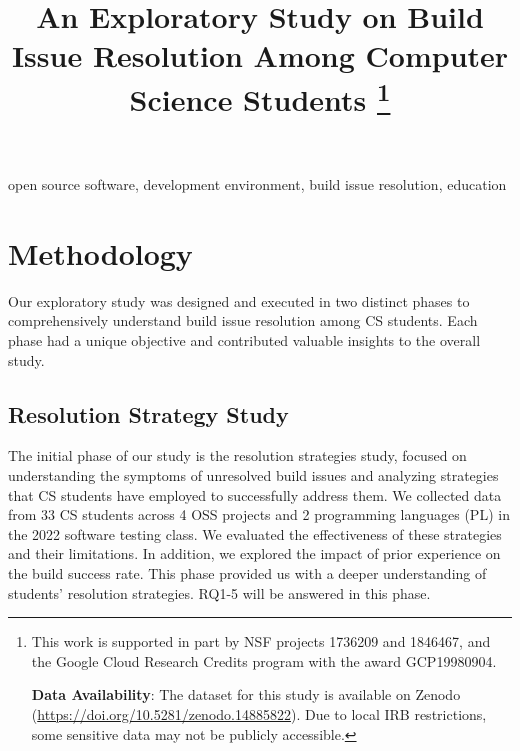\documentclass[10pt, conference]{IEEEtran}
\begin{document}
\title{An Exploratory Study on Build Issue Resolution Among Computer Science Students
\thanks{This work is supported in part by NSF projects 1736209 and 1846467, and the Google Cloud Research Credits program with the award GCP19980904. 

\textbf{Data Availability}: The dataset for this study is available on Zenodo (\href{https://doi.org/10.5281/zenodo.14885822}{https://doi.org/10.5281/zenodo.14885822}). Due to local IRB restrictions, some sensitive data may not be publicly accessible.}
}


\author{

}

\maketitle



\begin{IEEEkeywords}
open source software, development environment, build issue resolution, education
\end{IEEEkeywords}




\section{Methodology}
Our exploratory study was designed and executed in two distinct phases to comprehensively understand build issue resolution among CS students. Each phase had a unique objective and contributed valuable insights to the overall study.

\subsection{Resolution Strategy Study}
The initial phase of our study is the resolution strategies study, focused on understanding the symptoms of unresolved build issues and analyzing strategies that CS students have employed to successfully address them. We collected data from 33 CS students across 4 OSS projects and 2 programming languages (PL) in the 2022 software testing class. We evaluated the effectiveness of these strategies and their limitations. In addition, we explored the impact of prior experience on the build success rate. This phase provided us with a deeper understanding of students' resolution strategies. RQ1-5 will be answered in this phase.
\end{document}

